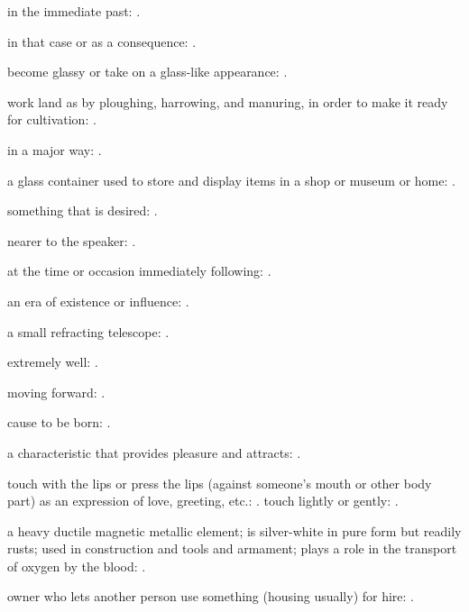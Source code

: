   in the immediate past: .

  in that case or as a consequence: .

  become glassy or take on a glass-like appearance:   .

  work land as by ploughing, harrowing, and manuring, in order to make it ready for cultivation: .

  in a major way: .

  a glass container used to store and display items in a shop or museum or home:   .

  something that is desired: .

  nearer to the speaker: .

  at the time or occasion immediately following: .

  an era of existence or influence: .

  a small refracting telescope:   .

  extremely well: .

  moving forward:   .

  cause to be born:   .

  a characteristic that provides pleasure and attracts:   .

  touch with the lips or press the lips (against someone's mouth or other body part) as an expression of love, greeting, etc.:   . touch lightly or gently: .

  a heavy ductile magnetic metallic element; is silver-white in pure form but readily rusts; used in construction and tools and armament; plays a role in the transport of oxygen by the blood:   .

  owner who lets another person use something (housing usually) for hire: .

